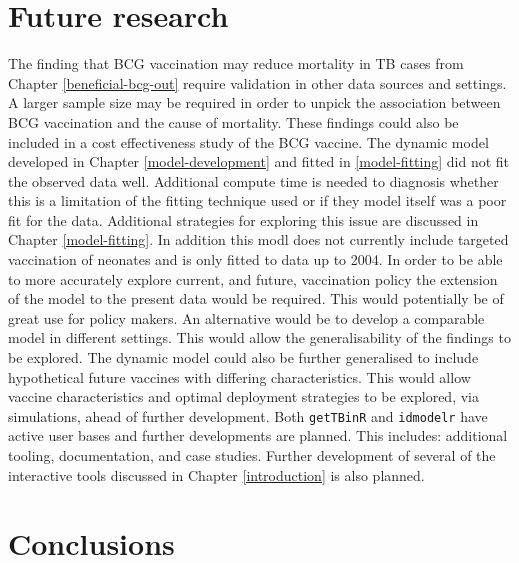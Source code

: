 \documentclass[11pt,twoside]{bristolthesis}
\begin{document}
  \hypertarget{future-research}{%
  \section{Future research}\label{future-research}}
  
  The finding that BCG vaccination may reduce mortality in TB cases from Chapter \ref{beneficial-bcg-out} require validation in other data sources and settings. A larger sample size may be required in order to unpick the association between BCG vaccination and the cause of mortality. These findings could also be included in a cost effectiveness study of the BCG vaccine. The dynamic model developed in Chapter \ref{model-development} and fitted in \ref{model-fitting} did not fit the observed data well. Additional compute time is needed to diagnosis whether this is a limitation of the fitting technique used or if they model itself was a poor fit for the data. Additional strategies for exploring this issue are discussed in Chapter \ref{model-fitting}. In addition this modl does not currently include targeted vaccination of neonates and is only fitted to data up to 2004. In order to be able to more accurately explore current, and future, vaccination policy the extension of the model to the present data would be required. This would potentially be of great use for policy makers. An alternative would be to develop a comparable model in different settings. This would allow the generalisability of the findings to be explored. The dynamic model could also be further generalised to include hypothetical future vaccines with differing characteristics. This would allow vaccine characteristics and optimal deployment strategies to be explored, via simulations, ahead of further development. Both \texttt{getTBinR} and \texttt{idmodelr} have active user bases and further developments are planned. This includes: additional tooling, documentation, and case studies. Further development of several of the interactive tools discussed in Chapter \ref{introduction} is also planned.
  
  \hypertarget{conclusions}{%
  \section{Conclusions}\label{conclusions}}
  
\end{document}
